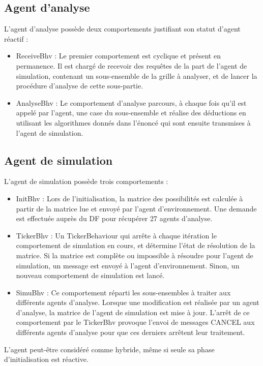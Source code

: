 \documentclass[a4paper,11pt]{article}
\begin{document}
\subsection{Agent d'analyse}
L'agent d'analyse possède deux comportements justifiant son statut d'agent réactif :
\begin{itemize}
\item ReceiveBhv : Le premier comportement est cyclique et présent en permanence. Il est chargé de recevoir des requêtes de la part de l'agent de simulation, contenant un sous-ensemble de la grille à analyser, et de lancer la procédure d'analyse de cette sous-partie.
\item AnalyseBhv : Le comportement d'analyse parcours, à chaque fois qu'il est appelé par l'agent, une case du sous-ensemble et réalise des déductions en utilisant les algorithmes donnés dans l'énoncé qui sont ensuite transmises à l'agent de simulation.
\end{itemize}

\subsection{Agent de simulation}
L'agent de simulation possède trois comportements :
\begin{itemize}
\item InitBhv : Lors de l'initialisation, la matrice des possibilités est calculée à partir de la matrice lue et envoyé par l'agent d'environnement.
Une demande est effectuée auprès du DF pour récupérer 27 agents d'analyse.
\item TickerBhv : Un TickerBehaviour qui arrête à chaque itération le comportement de simulation en cours, et détermine l'état de résolution de la matrice.
Si la matrice est complète ou impossible à résoudre pour l'agent de simulation, un message est envoyé à l'agent d'environnement.
Sinon, un nouveau comportement de simulation est lancé.
\item SimuBhv : Ce comportement réparti les sous-ensembles à traiter aux différents agents d'analyse. 
Lorsque une modification est réalisée par un agent d'analyse, la matrice de l'agent de simulation est mise à jour. L'arrêt de ce comportement par le TickerBhv provoque l'envoi de messages CANCEL aux différents agents d'analyse pour que ces derniers arrêtent leur traitement.
\end{itemize}
L'agent peut-être considéré comme hybride, même si seule sa phase d'initialisation est réactive.
\end{document}
